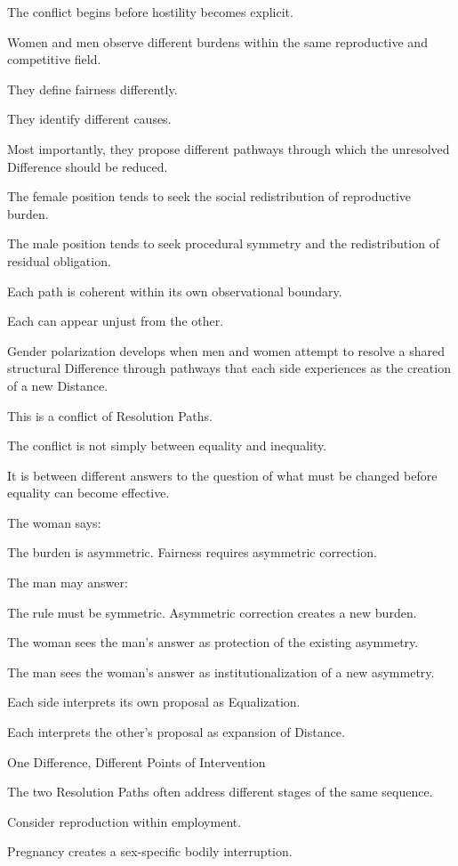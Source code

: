 The conflict begins before hostility becomes explicit.

Women and men observe different burdens within the same reproductive and competitive field.

They define fairness differently.

They identify different causes.

Most importantly, they propose different pathways through which the unresolved Difference should be reduced.

The female position tends to seek the social redistribution of reproductive burden.

The male position tends to seek procedural symmetry and the redistribution of residual obligation.

Each path is coherent within its own observational boundary.

Each can appear unjust from the other.

Gender polarization develops when men and women attempt to resolve a shared structural Difference through pathways that each side experiences as the creation of a new Distance.

This is a conflict of Resolution Paths.

The conflict is not simply between equality and inequality.

It is between different answers to the question of what must be changed before equality can become effective.

The woman says:

The burden is asymmetric. Fairness requires asymmetric correction.

The man may answer:

The rule must be symmetric. Asymmetric correction creates a new burden.

The woman sees the man’s answer as protection of the existing asymmetry.

The man sees the woman’s answer as institutionalization of a new asymmetry.

Each side interprets its own proposal as Equalization.

Each interprets the other’s proposal as expansion of Distance.

One Difference, Different Points of Intervention

The two Resolution Paths often address different stages of the same sequence.

Consider reproduction within employment.

Pregnancy creates a sex-specific bodily interruption.

